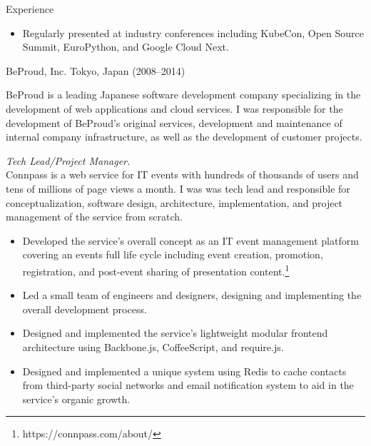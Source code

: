 \documentclass{resume}
\begin{document}
\begin{category}{Experience}
\begin{itemize}
\begin{itemize}
            \item Regularly presented at industry conferences including
                KubeCon, Open Source Summit, EuroPython, and Google Cloud Next.

        \end{itemize}

    \end{itemize}

     BeProud, Inc. Tokyo, Japan (2008--2014)

    BeProud is a leading Japanese software development company specializing in
    the development of web applications and cloud services. I was responsible
    for the development of BeProud's original services, development and
    maintenance of internal company infrastructure, as well as the development
    of customer projects.

    \begin{itemize}

         \emph{Tech Lead/Project Manager.}\\
            Connpass is a web service for IT events with hundreds of
            thousands of users and tens of millions of page views a month. I was
            was tech lead and responsible for conceptualization, software
            design, architecture, implementation, and project management of the
            service from scratch.

        \begin{itemize}

            \item Developed the service's overall concept as an IT event
                management platform covering an events full life cycle including
                event creation, promotion, registration, and post-event sharing
                of presentation content.\footnote{https://connpass.com/about/}

            \item Led a small team of engineers and designers, designing and
                implementing the overall development process.

            \item Designed and implemented the service's lightweight modular
                frontend architecture using Backbone.js, CoffeeScript, and
                require.js.

            \item Designed and implemented a unique system using Redis to cache
                contacts from third-party social networks and email notification
                system to aid in the service's organic growth.


\end{itemize}
\end{itemize}
\end{category}
\end{document}
